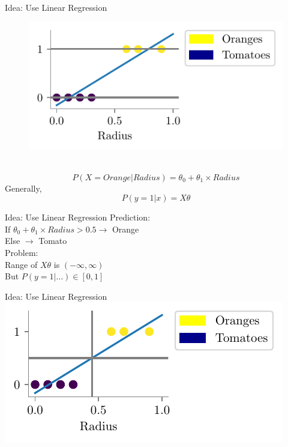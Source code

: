 \documentclass{beamer}
\begin{document}
\begin{frame}{Idea: Use Linear Regression}
\hspace{2.5cm}
\begin{minipage}{0.3\textwidth}
	
	\begin{figure}
		
		\includegraphics{../figures/logistic-regression/linear-orange-tomatoes.pdf}
	\end{figure}
\end{minipage} \\
\begin{equation*}
P(X = Orange | Radius) = \theta_{0} + \theta_{1} \times Radius
\end{equation*}
\pause Generally,
\begin{equation*}
P(y = 1 | x) = X\theta
\end{equation*}
\end{frame}
\begin{frame}{Idea: Use Linear Regression}
Prediction:\\
If $\theta_{0} + \theta_{1}\times Radius > 0.5 \rightarrow$ Orange \\
\hspace{3.3cm} Else $\rightarrow$ Tomato\\
Problem:\\
Range of $X\theta$ is $(-\infty, \infty)$\\
But $P(y = 1 | \ldots) \in [0, 1]$
\end{frame}

\begin{frame}{Idea: Use Linear Regression}
\includegraphics{../figures/logistic-regression/linear-orange-tomatoes-decision.pdf}
\end{frame}
\end{document}
